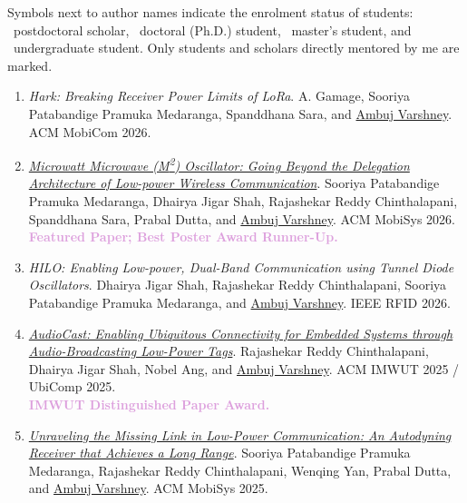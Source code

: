 
\providecommand{\symbollegend}[1]{#1}
\symbollegend{Symbols next to author names indicate the enrolment status of students: \postdoc~postdoctoral scholar, \phd~doctoral (Ph.D.) student, \pg~master's student, and \ug~undergraduate student. Only students and scholars directly mentored by me are marked.}

\begin{enumerate}[itemsep=1.2em, topsep=0.6em]

\item
\emph{Hark: Breaking Receiver Power Limits of LoRa}.
A. Gamage\postdoc, Sooriya Patabandige Pramuka Medaranga\phd, Spanddhana Sara\phd, and \underline{Ambuj Varshney}.
\textcolor{accent}{ACM MobiCom 2026}.

\item
\emph{\href{https://dl.acm.org/doi/10.1145/3745756.3809248}{Microwatt Microwave (M\textsuperscript{2}) Oscillator: Going Beyond the Delegation Architecture of Low-power Wireless Communication}}.
Sooriya Patabandige Pramuka Medaranga\phd, Dhairya Jigar Shah\phd, Rajashekar Reddy Chinthalapani\phd, Spanddhana Sara\phd, Prabal Dutta, and \underline{Ambuj Varshney}.
\textcolor{accent}{ACM MobiSys 2026}.\\
\textcolor{plum}{\textbf{Featured Paper; Best Poster Award Runner-Up.}}

\item
\emph{HILO: Enabling Low-power, Dual-Band Communication using Tunnel Diode Oscillators}.
Dhairya Jigar Shah\phd, Rajashekar Reddy Chinthalapani\phd, Sooriya Patabandige Pramuka Medaranga\phd, and \underline{Ambuj Varshney}.
\textcolor{accent}{IEEE RFID 2026}.

\item
\emph{\href{https://dl.acm.org/doi/10.1145/3729471}{AudioCast: Enabling Ubiquitous Connectivity for Embedded Systems through Audio-Broadcasting Low-Power Tags}}.
Rajashekar Reddy Chinthalapani\phd, Dhairya Jigar Shah\phd, Nobel Ang\ug, and \underline{Ambuj Varshney}.
\textcolor{accent}{ACM IMWUT 2025 / UbiComp 2025}.\\
\textcolor{plum}{\textbf{IMWUT Distinguished Paper Award.}}

\item
\emph{\href{https://dl.acm.org/doi/10.1145/3711875.3729164}{Unraveling the Missing Link in Low-Power Communication: An Autodyning Receiver that Achieves a Long Range}}.
Sooriya Patabandige Pramuka Medaranga\phd, Rajashekar Reddy Chinthalapani\phd, Wenqing Yan\phd, Prabal Dutta, and \underline{Ambuj Varshney}.
\textcolor{accent}{ACM MobiSys 2025}.


\end{enumerate}
